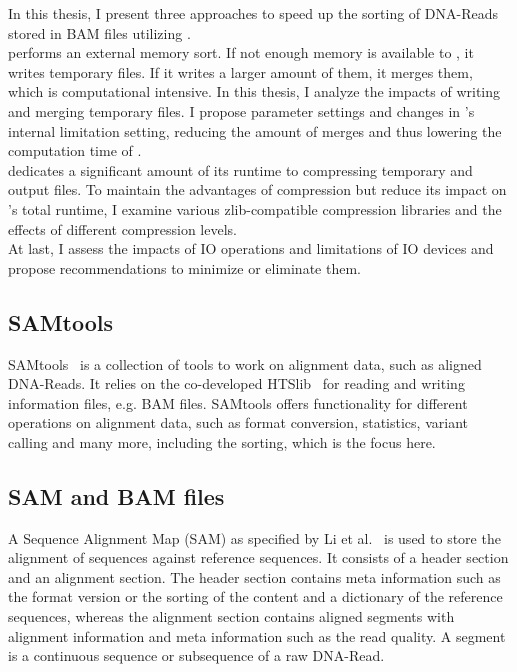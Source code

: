 In this thesis, I present three approaches to speed up the sorting of DNA-Reads stored in BAM files utilizing \sort. \\

\sort performs an external memory sort. If not enough memory is available to \sort, it writes temporary files. If it writes a larger amount of them, it merges them, which is computational intensive. In this thesis, I analyze the impacts of \sort writing and merging temporary files. I propose parameter settings and changes in \sort's internal limitation setting, reducing the amount of merges and thus lowering the computation time of \sort. \\

\sort dedicates a significant amount of its runtime to compressing temporary and output files. To maintain the advantages of compression but reduce its impact on \sort's total runtime, I examine various zlib-compatible compression libraries and the effects of different compression levels. \\

At last, I assess the impacts of IO operations and limitations of IO devices and propose recommendations to minimize or eliminate them.



\subsection{SAMtools}
SAMtools~\cite{12ySamtools} is a collection of tools to work on alignment data, such as aligned DNA-Reads. It relies on the co-developed HTSlib~\cite{bonfield_htslib_2021} for reading and writing information files, e.g. BAM files. SAMtools offers functionality for different operations on alignment data, such as format conversion, statistics, variant calling and many more, including the sorting, which is the focus here. \\

\subsection{SAM and BAM files}
A Sequence Alignment Map (SAM) as specified by Li et al.~\cite{samformat} is used to store the alignment of sequences against reference sequences. It consists of a header section and an alignment section. The header section contains meta information such as the format version or the sorting of the content and a dictionary of the reference sequences, whereas the alignment section contains aligned segments with alignment information and meta information such as the read quality. A segment is a continuous sequence or subsequence of a raw DNA-Read. \\

